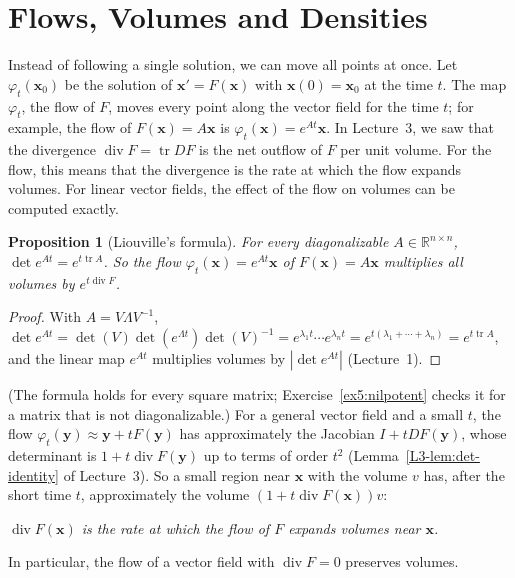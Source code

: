 \documentclass[11pt]{article}
\theoremstyle{definition}
\theoremstyle{plain}
\newtheorem{proposition}[definition]{Proposition}
\theoremstyle{remark}
\DeclareMathOperator{\tr}{tr}
\DeclareMathOperator{\Div}{div}
\begin{document}
\section{Flows, Volumes and Densities}\label{sec:flows}

Instead of following a single solution, we can move all points at once. Let $\varphi_t(\mathbf{x}_0)$ be the solution of $\mathbf{x}' = F(\mathbf{x})$ with $\mathbf{x}(0) = \mathbf{x}_0$ at the time $t$. The map $\varphi_t$, the flow of $F$, moves every point along the vector field for the time $t$; for example, the flow of $F(\mathbf{x}) = A\mathbf{x}$ is $\varphi_t(\mathbf{x}) = e^{At}\mathbf{x}$. In Lecture~3, we saw that the divergence $\Div F = \tr DF$ is the net outflow of $F$ per unit volume. For the flow, this means that the divergence is the rate at which the flow expands volumes. For linear vector fields, the effect of the flow on volumes can be computed exactly.

\begin{proposition}[Liouville's formula]\label{prop:liouville}
    For every diagonalizable $A \in \mathbb{R}^{n \times n}$, $\det e^{At} = e^{t\tr A}$. So the flow $\varphi_t(\mathbf{x}) = e^{At}\mathbf{x}$ of $F(\mathbf{x}) = A\mathbf{x}$ multiplies all volumes by $e^{t\Div F}$.
\end{proposition}

\begin{proof}
    With $A = V\Lambda V^{-1}$, $\det e^{At} = \det(V)\det(e^{\Lambda t})\det(V)^{-1} = e^{\lambda_1 t}\cdots e^{\lambda_n t} = e^{t(\lambda_1 + \cdots + \lambda_n)} = e^{t\tr A}$, and the linear map $e^{At}$ multiplies volumes by $|\det e^{At}|$ (Lecture~1).
\end{proof}

(The formula holds for every square matrix; Exercise~\ref{ex5:nilpotent} checks it for a matrix that is not diagonalizable.) For a general vector field and a small $t$, the flow $\varphi_t(\mathbf{y}) \approx \mathbf{y} + tF(\mathbf{y})$ has approximately the Jacobian $I + tDF(\mathbf{y})$, whose determinant is $1 + t\Div F(\mathbf{y})$ up to terms of order $t^2$ (Lemma~\ref{L3-lem:det-identity} of Lecture~3). So a small region near $\mathbf{x}$ with the volume $v$ has, after the short time $t$, approximately the volume $(1 + t\Div F(\mathbf{x}))v$:
\begin{center}
    \emph{$\Div F(\mathbf{x})$ is the rate at which the flow of $F$ expands volumes near $\mathbf{x}$.}
\end{center}
In particular, the flow of a vector field with $\Div F = 0$ preserves volumes.
\end{document}
